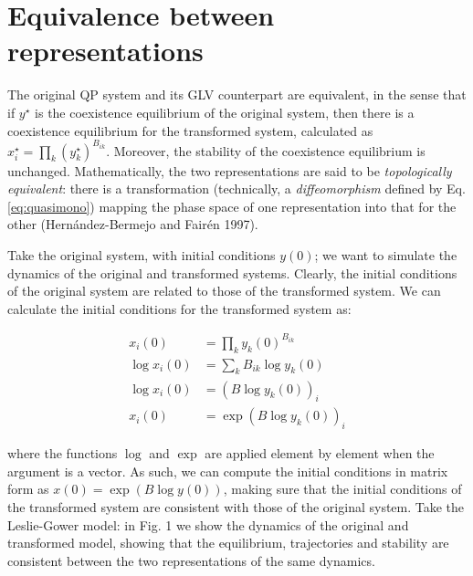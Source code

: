 \documentclass{article}
\begin{document}
\hypertarget{equivalence-between-representations}{%
\section{Equivalence between
representations}\label{equivalence-between-representations}}

The original QP system and its GLV counterpart are equivalent, in the
sense that if \(y^\star\) is the coexistence equilibrium of the original
system, then there is a coexistence equilibrium for the transformed
system, calculated as \(x_i^\star = \prod_{k} (y_k^\star)^{B_{ik}}\).
Moreover, the stability of the coexistence equilibrium is unchanged.
Mathematically, the two representations are said to be
\emph{topologically equivalent}: there is a transformation (technically,
a \emph{diffeomorphism} defined by Eq. \ref{eq:quasimono}) mapping the
phase space of one representation into that for the other
(Hernández-Bermejo and Fairén 1997).

Take the original system, with initial conditions \(y(0)\); we want to
simulate the dynamics of the original and transformed systems. Clearly,
the initial conditions of the original system are related to those of
the transformed system. We can calculate the initial conditions for the
transformed system as:

\begin{equation}
\begin{aligned}
x_i(0) &= \prod_{k} {y_k(0)}^{B_{ik}}\\
\log x_i(0) &= \sum_k B_{ik} \log y_k(0)\\
\log x_i(0) &= (B \log y_k(0))_i\\
x_i(0) &= \exp(B \log y_k(0))_i
\end{aligned}
\end{equation}

where the functions \(\log\) and \(\exp\) are applied element by element
when the argument is a vector. As such, we can compute the initial
conditions in matrix form as \(x(0) = \exp(B \log y(0))\), making sure
that the initial conditions of the transformed system are consistent
with those of the original system. Take the Leslie-Gower model: in Fig.
1 we show the dynamics of the original and transformed model, showing
that the equilibrium, trajectories and stability are consistent between
the two representations of the same dynamics.
\end{document}
